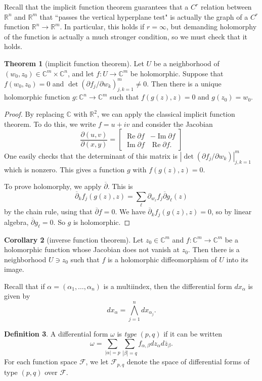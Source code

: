 \documentclass[12pt]{report}
\newcommand{\RR}{\mathbb{R}}
\newcommand{\CC}{\mathbb{C}}
\newcommand{\dbar}{\overline\partial}
\renewcommand{\Re}{\operatorname{Re}}
\renewcommand{\Im}{\operatorname{Im}}
\newcommand{\dfn}[1]{\emph{#1}\index{#1}}
\theoremstyle{definition}
\newtheorem{theorem}{Theorem}[chapter]
\newtheorem{corollary}[theorem]{Corollary}
\newtheorem{definition}[theorem]{Definition}
\begin{document}
Recall that the implicit function theorem guarantees that a $C^r$ relation between $\RR^n$ and $\RR^m$ that ``passes the vertical hyperplane test" is actually the graph of a $C^r$ function $\RR^n \to \RR^m$. In particular, this holds if $r = \infty$, but demanding holomorphy of the function is actually a much stronger condition, so we must check that it holds.
\begin{theorem}[implicit function theorem]
    Let $U$ be a neighborhood of $(w_0, z_0) \in \CC^m \times \CC^n$, and let $f: U \to \CC^m$ be holomorphic. Suppose that $f(w_0, z_0) = 0$ and $\det(\partial f_j/\partial w_k)_{j,k=1}^m \neq 0$. Then there is a unique holomorphic function $g: \CC^n \to \CC^m$ such that $f(g(z), z) = 0$ and $g(z_0) = w_0$.
\end{theorem}
\begin{proof}
    By replacing $\CC$ with $\RR^2$, we can apply the classical implicit function theorem. To do this, we write $f = u + iv$ and consider the Jacobian
$$\frac{\partial(u,v)}{\partial(x,y)} = \begin{bmatrix}
    \Re \partial f & -\Im \partial f\\
    \Im \partial f & \Re \partial f.
\end{bmatrix}$$
    One easily checks that the determinant of this matrix is $|\det(\partial f_j/\partial w_k)|_{j,k=1}^m$ which is nonzero. This gives a function $g$ with $f(g(z), z) = 0$.

    To prove holomorphy, we apply $\dbar$. This is
$$\dbar_k f_j(g(z), z) = \sum_\ell \partial_{w_\ell} f_j \dbar g_\ell(z)$$
    by the chain rule, using that $\dbar f = 0$. We have $\dbar_k f_j(g(z), z) = 0$, so by linear algebra, $\dbar g_\ell = 0$. So $g$ is holomorphic.
\end{proof}
\begin{corollary}[inverse function theorem]
    Let $z_0 \in \CC^m$ and $f: \CC^m \to \CC^m$ be a  holomorphic function whose Jacobian does not vanish at $z_0$. Then there is a neighborhood $U \ni z_0$ such that $f$ is a holomorphic diffeomorphism of $U$ into its image.
\end{corollary}

    Recall that if $\alpha = (\alpha_1, \dots, \alpha_n)$ is a multiindex, then the differential form $dx_\alpha$ is given by
    $$dx_\alpha = \bigwedge_{j=1}^n dx_{\alpha_j}.$$
\begin{definition}
    A differential form $\omega$ is \dfn{type} $(p, q)$ if it can be written
    $$\omega = \sum_{|\alpha| = p} \sum_{|\beta| = q} f_{\alpha,\beta} dz_\alpha d\overline z_\beta.$$
    For each function space $\mathcal F$, we let $\mathcal F_{p,q}$ denote the space of differential forms of type $(p, q)$ over $\mathcal F$.
\end{definition}
\end{document}
